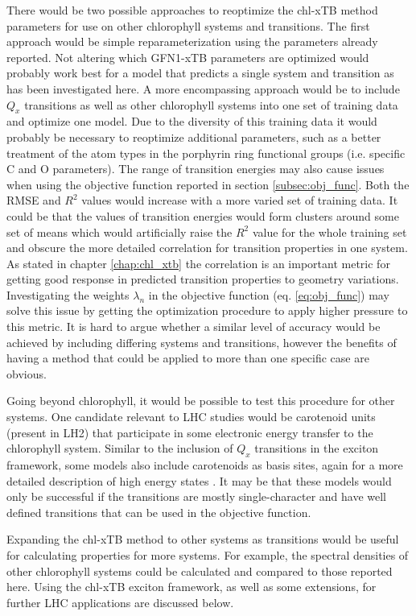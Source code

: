 There would be two possible approaches to reoptimize the chl-xTB method parameters 
for use on other chlorophyll systems and transitions. The first approach would be 
simple reparameterization using the parameters already reported. Not altering which
GFN1-xTB parameters are optimized would probably work best for a model that predicts
a single system and transition as has been investigated here. A more encompassing 
approach would be to include $Q_x$ transitions as well as other chlorophyll systems
into one set of training data and optimize one model. Due to the diversity of this
training data it would probably be necessary to reoptimize additional parameters,
such as a better treatment of the atom types in the porphyrin ring functional groups 
(i.e. specific C and O parameters). The range of transition energies may also cause
issues when using the objective function reported in section \ref{subsec:obj_func}.
Both the RMSE and $R^2$ values would increase with a more varied set of training 
data. It could be that the values of transition energies would form clusters around
some set of means which would artificially raise the $R^2$ value for the whole training
set and obscure the more detailed correlation for transition properties in one system.
As stated in chapter \ref{chap:chl_xtb} the correlation is an important metric for
getting good response in predicted transition properties to geometry variations.
Investigating the weights $\lambda_n$ in the objective function (eq. \ref{eq:obj_func})
may solve this issue by getting the optimization procedure to apply higher pressure
to this metric. It is hard to argue whether a similar level of accuracy would be
achieved by including differing systems and transitions, however the benefits of 
having a method that could be applied to more than one specific case are obvious.

Going beyond chlorophyll, it would be possible to test this procedure for other 
systems. One candidate relevant to LHC studies would be carotenoid units (present
in LH2) that participate in some electronic energy transfer to the chlorophyll system.
Similar to the inclusion of $Q_x$ transitions in the exciton framework, some models
also include carotenoids as basis sites, again for a more detailed description of
high energy states \cite{Polli2006, Andreussi2015}. It may be that these models 
would only be successful if the transitions are mostly single-character and have 
well defined transitions that can be used in the objective function. 

Expanding the chl-xTB method to other systems as transitions would be useful for
calculating properties for more systems. For example, the spectral densities of 
other chlorophyll systems could be calculated and compared to those reported here.
Using the chl-xTB exciton framework, as well as some extensions, for further LHC
applications are discussed below.


